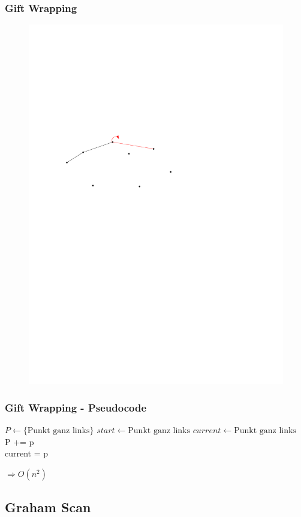 \begin{frame}
	\frametitle{{Gift Wrapping}}
\begin{figure}[htbp]
	\begin{center}
  	\includegraphics[width=.8\linewidth]{bilder/giftwrap3}
	\end{center}
\end{figure}
\end{frame}


\begin{frame}
	\frametitle{{Gift Wrapping - Pseudocode}}
	\begin{algorithmic}
\State $P\gets \{\mbox{Punkt ganz links}\}$
\State $start\gets \mbox{Punkt ganz links}$
\State $current\gets \mbox{Punkt ganz links}$
\\
\Repeat 
			P += p\\
			current = p
		\EndIf
	\EndFor
{}
\end{algorithmic}
$\Rightarrow O(n^2)$
\end{frame}

\subsection{Graham Scan}


